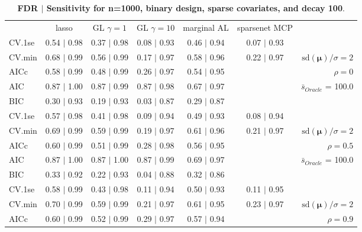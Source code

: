 \begin{table}\vspace{-.5cm}
\caption[l]{ {\it }
{ \bf FDR $\boldsymbol{\mid}$ Sensitivity for n=1000, binary design, sparse covariates, and  decay  100}.}
\vspace{-.5cm}
\footnotesize{}
\begin{center}
\begin{tabular}{l*{5}{c}|r}
 & lasso & GL $\gamma=1$ & GL $\gamma=10$ & marginal AL & sparsenet MCP  & \\
 \cline{1-7}
CV.1se & 0.54 $\mid$ 0.98 & 0.37 $\mid$ 0.98 & 0.08 $\mid$ 0.93 & 0.46 $\mid$ 0.94 & 0.07 $\mid$ 0.93 & \\
CV.min & 0.68 $\mid$ 0.99 & 0.56 $\mid$ 0.99 & 0.17 $\mid$ 0.97 & 0.58 $\mid$ 0.96 & 0.22 $\mid$ 0.97 &  $\mathrm{sd}(\mathbf{\mu})/\sigma=2$ \\
AICc & 0.58 $\mid$ 0.99 & 0.48 $\mid$ 0.99 & 0.26 $\mid$ 0.97 & 0.54 $\mid$ 0.95 & & $\rho=0$ \\
AIC & 0.87 $\mid$ 1.00 & 0.87 $\mid$ 0.99 & 0.87 $\mid$ 0.98 & 0.67 $\mid$ 0.97 & &  \multirow{2}{*}{$\bar{s}_{Oracle}$ = 100.0} \\
BIC & 0.30 $\mid$ 0.93 & 0.19 $\mid$ 0.93 & 0.03 $\mid$ 0.87 & 0.29 $\mid$ 0.87 & &  \\
 \hline 
CV.1se & 0.57 $\mid$ 0.98 & 0.41 $\mid$ 0.98 & 0.09 $\mid$ 0.94 & 0.49 $\mid$ 0.93 & 0.08 $\mid$ 0.94 & \\
CV.min & 0.69 $\mid$ 0.99 & 0.59 $\mid$ 0.99 & 0.19 $\mid$ 0.97 & 0.61 $\mid$ 0.96 & 0.21 $\mid$ 0.97 &  $\mathrm{sd}(\mathbf{\mu})/\sigma=2$ \\
AICc & 0.60 $\mid$ 0.99 & 0.51 $\mid$ 0.99 & 0.28 $\mid$ 0.98 & 0.56 $\mid$ 0.95 & & $\rho=0.5$ \\
AIC & 0.87 $\mid$ 1.00 & 0.87 $\mid$ 1.00 & 0.87 $\mid$ 0.99 & 0.69 $\mid$ 0.97 & &  \multirow{2}{*}{$\bar{s}_{Oracle}$ = 100.0} \\
BIC & 0.33 $\mid$ 0.92 & 0.22 $\mid$ 0.93 & 0.04 $\mid$ 0.88 & 0.32 $\mid$ 0.86 & &  \\
 \hline 
CV.1se & 0.58 $\mid$ 0.99 & 0.43 $\mid$ 0.98 & 0.11 $\mid$ 0.94 & 0.50 $\mid$ 0.93 & 0.11 $\mid$ 0.95 & \\
CV.min & 0.70 $\mid$ 0.99 & 0.59 $\mid$ 0.99 & 0.21 $\mid$ 0.97 & 0.61 $\mid$ 0.95 & 0.23 $\mid$ 0.97 &  $\mathrm{sd}(\mathbf{\mu})/\sigma=2$ \\
AICc & 0.60 $\mid$ 0.99 & 0.52 $\mid$ 0.99 & 0.29 $\mid$ 0.97 & 0.57 $\mid$ 0.94 & & $\rho=0.9$ \\

\end{tabular}
\end{center}
\end{table}
